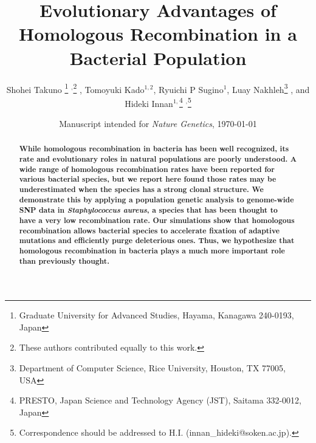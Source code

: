 \documentclass[twoside,twocolumn, letterpaper]{article}
\title{Evolutionary Advantages of Homologous Recombination in a Bacterial Population}
\author{
Shohei Takuno
\thanks{Graduate University for Advanced Studies, Hayama, Kanagawa 240-0193, Japan } $^,$\thanks{These authors contributed equally to this work.}
 \hspace{0.5mm}, Tomoyuki Kado$^{1,2}$, Ryuichi P Sugino$^{1}$, Luay Nakhleh\thanks{ 
Department of Computer Science, Rice University, Houston, TX 77005, USA} \hspace{0.5mm}, 
and Hideki Innan$^{1,}$\thanks{PRESTO, Japan Science and Technology Agency (JST), Saitama 332-0012, Japan} $^,$\thanks{Correspondence should be addressed to H.I. (innan\_hideki@soken.ac.jp).}\hspace{0.6mm}
}
\date{\small Manuscript intended for \emph{Nature Genetics}, \today}
\begin{document}
 
\maketitle

\begin{abstract}
\noindent \bf
\noindent While homologous recombination in bacteria has been well recognized, its rate and evolutionary roles in natural populations are poorly understood. A wide range of homologous recombination rates have been reported for various bacterial species, but we report 
 here found those rates may be underestimated when the species has a strong clonal structure. We demonstrate this by applying a population genetic analysis to genome-wide SNP data in \emph{Staphylococcus aureus}, a species that has been thought to have a very low recombination rate. Our simulations show that homologous recombination allows bacterial species to accelerate fixation of 
 adaptive mutations and efficiently purge deleterious ones. Thus, we hypothesize that homologous recombination in bacteria plays 
 a much more important role than previously thought. 

 
\end{abstract}
\end{document}

